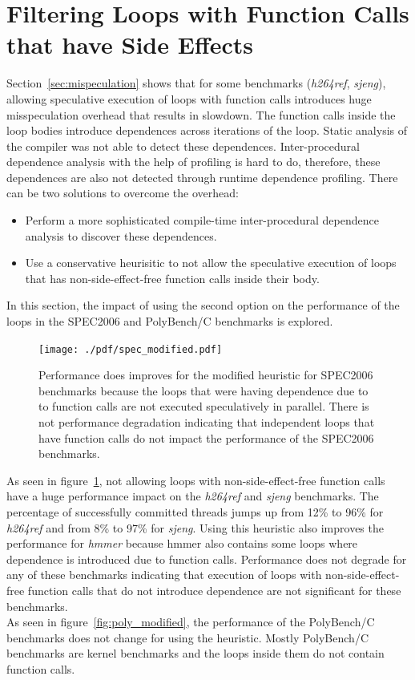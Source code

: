 \documentclass[10pt]{report}          %
\begin{document}
\section{Filtering Loops with Function Calls that have Side Effects }

Section~\ref{sec:mispeculation} shows that for some benchmarks (\textit{h264ref}, \textit{sjeng}), allowing speculative execution of loops with function calls introduces huge misspeculation overhead that results in slowdown.  The function calls inside the loop bodies introduce dependences across iterations of the loop.  Static analysis of the compiler was not able to detect these dependences.  Inter-procedural dependence analysis with the help of profiling is hard to do, therefore, these dependences are also not detected through runtime dependence profiling.  There can be two solutions to overcome the overhead: 
\begin{itemize}
\item Perform a more sophisticated compile-time inter-procedural dependence analysis to discover these dependences.
\item Use a conservative heurisitic to not allow the speculative execution of loops that has non-side-effect-free function calls inside their body.
\end{itemize}
In this section, the impact of using the second option on the performance of the loops in the SPEC2006 and PolyBench/C benchmarks is explored. 
\begin{figure}[h]
\centering
\texttt{[image: ./pdf/spec\_modified.pdf]}
\caption{Performance does improves for the modified heuristic for SPEC2006 benchmarks because the loops that were having dependence due to to function calls are not executed speculatively in parallel.  There is not performance degradation indicating that independent loops that have function calls do not impact the performance of the SPEC2006 benchmarks.}
\label{fig:spec_modified}
\end{figure}
As seen in figure~\ref{fig:spec_modified}, not allowing loops with non-side-effect-free function calls have a huge performance impact on the \textit{h264ref} and \textit{sjeng} benchmarks.  The percentage of successfully committed threads jumps up from 12\% to 96\% for \textit{h264ref} and from 8\% to 97\% for \textit{sjeng}.  Using this heuristic also improves the performance for \textit{hmmer} because hmmer also contains some loops where dependence is introduced due to function calls.  Performance does not degrade for any of these benchmarks indicating that execution of loops with non-side-effect-free function calls that do not introduce dependence are not significant for these benchmarks. \\
As seen in figure~\ref{fig:poly_modified}, the performance of the PolyBench/C benchmarks does not change for using the heuristic.  Mostly PolyBench/C benchmarks are kernel benchmarks and the loops inside them do not contain function calls.
\end{document}
